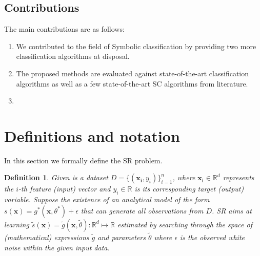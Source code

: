 \documentclass{bmcart}
\newtheorem{definition}{Definition}
\begin{document}
 
 

\subsection{Contributions}\label{sec:contibutions}

The main contributions are as follows: 

\begin{enumerate}
	\item We contributed to the field of Symbolic classification by providing two more classification algorithms at disposal. 
	
	\item The proposed methods are evaluated against state-of-the-art classification algorithms as well as a few state-of-the-art SC algorithms from literature. 
	\item {}
\end{enumerate}
 
\section{Definitions and notation} \label{sec:search-space}

In this section we formally define the SR problem.

\begin{definition}\label{dfn:sr}
	Given is a dataset $D = \{(\mathbf{x_i}, y_i)\}_{i=1}^n$, where $\mathbf{x_i} \in \mathbb{R}^d$ represents the $i$-th feature (input) vector and $y_i \in \mathbb{R}$ is its corresponding target (output) variable. Suppose the existence of an analytical model of the form $s(\mathbf{x})= g^*(\mathbf{x}, \theta^*) + \epsilon $ that can generate  all observations from $D$.  
	SR aims at learning $\tilde{s}(\mathbf{x})=  \tilde{g}(\mathbf{x}, \tilde{\theta})  \colon \mathbb{R}^d \mapsto \mathbb{R}$  estimated by searching through the space of (mathematical) expressions  $\tilde{g}$ and parameters $\tilde{\theta}$ where  $\epsilon$ is the observed white noise within the given input data. 
	
\end{definition}
\end{document}
